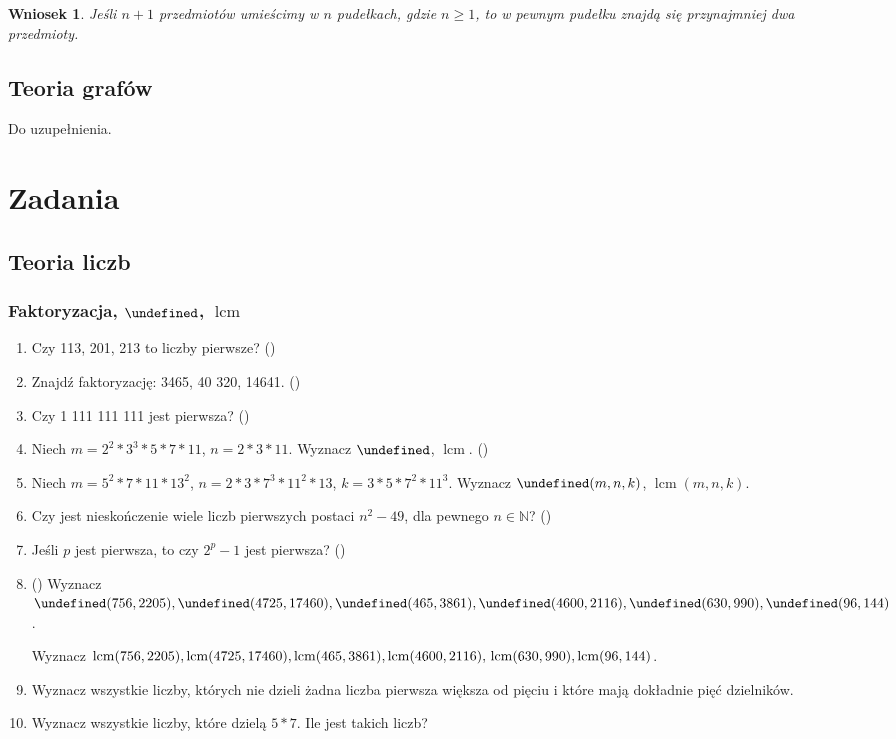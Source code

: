 \documentclass[12pt]{article}
\let\gcd\undefined
\DeclareMathOperator{\gcd}{gcd}
\DeclareMathOperator{\lcm}{lcm}
\newtheorem{crl}[thm]{Wniosek}
\newcommand{\NN}{\mathbb{N}}
\begin{document}
\begin{crl}
	Jeśli $n+1$ przedmiotów umieścimy w $n$ pudełkach, gdzie $n\geq 1$, 
	to w pewnym pudełku znajdą się przynajmniej dwa przedmioty.
\end{crl}

\subsection{Teoria grafów}
Do uzupełnienia.

\section{Zadania}
\subsection{Teoria liczb}
\subsubsection{Faktoryzacja, $\gcd$, $\lcm$}
\begin{enumerate}
	\item Czy 113, 201, 213 to liczby pierwsze? 
	(\cite[4.6.3, zad. 2]{Forman.2015})
	\item Znajdź faktoryzację: 3465, 40 320, 14641.  (\cite{Forman.2015})	
	\item  Czy 1 111 111 111 jest pierwsza? (\cite{Forman.2015})
	\item Niech $m = 2^2*3^3 * 5 * 7* 11$,  $n = 2*3*11$.
	Wyznacz $\gcd$, $\lcm$. (\cite{Forman.2015})
	\item Niech $m = 5^2*7*11*13^2$, $n = 2*3*7^3*11^2*13$,
	$k=3*5*7^2*11^3$.
	Wyznacz $\gcd(m,n,k)$, $\lcm(m,n,k)$. 
	\item 
	Czy jest nieskończenie wiele liczb pierwszych postaci $n^2 - 49$,
	dla pewnego $n\in\NN$? (\cite{Forman.2015})
	\item 
	Jeśli $p$ jest pierwsza, to czy $2^p - 1$ jest pierwsza? (\cite{Forman.2015})
	\item  (\cite{Forman.2015})
	Wyznacz
	$\gcd(756, 2205),
	\gcd(4725, 17460), 
	\gcd(465, 3861),
	\gcd(4600, 2116), \\
	\gcd(630, 990), 
	\gcd(96, 144)$.
	
	Wyznacz
	$\lcm(756, 2205),
	\lcm(4725, 17460),
	\lcm(465, 3861),
	\lcm(4600, 2116),\\
	\lcm(630, 990),
	\lcm(96, 144)$.
	
	
	\item Wyznacz wszystkie liczby, których nie dzieli
	żadna liczba pierwsza większa od pięciu i które mają 
	dokładnie pięć dzielników.
	
	\item Wyznacz wszystkie liczby, które dzielą $5*7$. 
	Ile jest takich liczb?
	
	
\end{enumerate}
\end{document}
